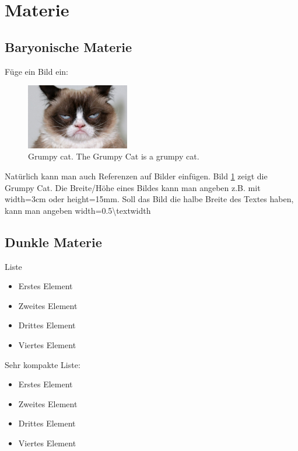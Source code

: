 
\section{Materie}

\lipsum[4]

\subsection{Baryonische Materie}

Füge ein Bild ein:
\begin{figure}[H]
	\centering
	\includegraphics[width=0.4\textwidth]{figures/grumpy_cat}
	\caption[Eintrag in Abbildungsverzeichnis von Grumpy Cat]{Grumpy cat. The Grumpy Cat is a grumpy cat.}
	\label{fig grumpy cat.}
\end{figure}
Natürlich kann man auch Referenzen auf Bilder einfügen.
Bild \ref{fig grumpy cat.} zeigt die Grumpy Cat.
Die Breite/Höhe eines Bildes kann man angeben z.B. mit width=3cm oder height=15mm.
Soll das Bild die halbe Breite des Textes haben, kann man angeben
width=0.5\textbackslash textwidth

\newpage

\subsection{Dunkle Materie}

Liste
\begin{itemize}
	\item Erstes Element
	\item Zweites Element
	\item Drittes Element
	\item Viertes Element
\end{itemize}

Sehr kompakte Liste:
\begin{itemize}
	\vspace{-\topsep}
	\setlength{\itemsep}{0pt}\setlength{\parskip}{0pt}
	\item Erstes Element
	\item Zweites Element
	\item Drittes Element
	\item Viertes Element
\end{itemize}

